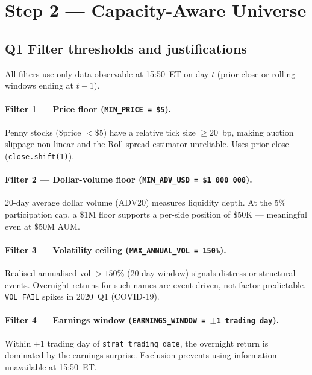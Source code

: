 \documentclass[12pt,a4paper]{article}
\begin{document}
\section{Step 2 --- Capacity-Aware Universe}

\subsection*{Q1 \quad Filter thresholds and justifications}
\label{sec:s2q1}

All filters use only data observable at 15:50~ET on day $t$ (prior-close or
rolling windows ending at $t-1$).

\paragraph{Filter 1 --- Price floor (\texttt{MIN\_PRICE = \$5}).}
Penny stocks (\$price $< \$5$) have a relative tick size $\geq 20$~bp,
making auction slippage non-linear and the Roll spread estimator unreliable.
Uses prior close (\texttt{close.shift(1)}).

\paragraph{Filter 2 --- Dollar-volume floor (\texttt{MIN\_ADV\_USD = \$1\,000\,000}).}
20-day average dollar volume (ADV20) measures liquidity depth.  At the 5\%
participation cap, a \$1M floor supports a per-side position of \$50K ---
meaningful even at \$50M AUM.

\paragraph{Filter 3 --- Volatility ceiling (\texttt{MAX\_ANNUAL\_VOL = 150\%}).}
Realised annualised vol $> 150\%$ (20-day window) signals distress or
structural events.  Overnight returns for such names are event-driven, not
factor-predictable.  \texttt{VOL\_FAIL} spikes in 2020~Q1 (COVID-19).

\paragraph{Filter 4 --- Earnings window (\texttt{EARNINGS\_WINDOW = $\pm$1 trading day}).}
Within $\pm 1$ trading day of \texttt{strat\_trading\_date}, the overnight
return is dominated by the earnings surprise.  Exclusion prevents using
information unavailable at 15:50~ET.
\end{document}

